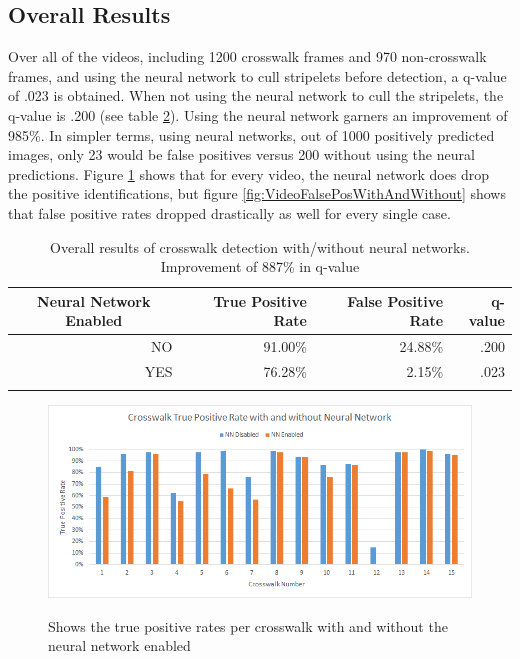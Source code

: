 \documentclass[12pt]{ucthesis}
\newcommand{\captionfonts}{\small\bf\ssp}
\begin{document}
\subsection{Overall Results}
Over all of the videos, including 1200 crosswalk frames and 970 non-crosswalk frames, and using the neural network to cull stripelets before detection, a q-value of .023 is obtained. When not using the neural network to cull the stripelets, the q-value is .200 (see table \ref{tab:overallresults}). Using the neural network garners an improvement of 985\%. In simpler terms, using neural networks, out of 1000 positively predicted images, only 23 would be false positives versus 200 without using the neural predictions. Figure \ref{fig:CrosswalkTruePosWithAndWithout} shows that for every video, the neural network does drop the positive identifications, but figure \ref{fig:VideoFalsePosWithAndWithout} shows that false positive rates dropped drastically as well for every single case. 


\begin{table}[t]
    \begin{longtable}{|r|r|r|r|}
    \hline
    \multicolumn{1}{|c|}{Neural Network Enabled} & True Positive Rate & False Positive Rate & q-value \bigstrut\\
    \hline
    NO & 91.00\% & 24.88\% & .200 \bigstrut\\
    \hline
    YES & 76.28\% & 2.15\% & .023 \bigstrut\\
    \hline


    \caption[Overall results of crosswalk detection with and without neural networks]{Overall results of crosswalk detection with/without neural networks. Improvement of 887\% in q-value}
    \label{tab:overallresults} 
    \end{longtable}
\end{table}

\begin{figure}[t]
\begin{center}
\includegraphics[width=14cm]{CrosswalkTruePosWithAndWithout.png}
\captionfonts
\caption[Crosswalk True Positive Rate with and without Neural Network]{Shows the true positive rates per crosswalk with and without the neural network enabled}
\label{fig:CrosswalkTruePosWithAndWithout}
\end{center}
\end{figure}
\end{document}
